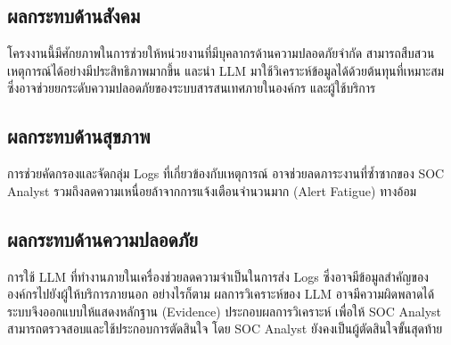 



\subsection{ผลกระทบด้านสังคม}
โครงงานนี้มีศักยภาพในการช่วยให้หน่วยงานที่มีบุคลากรด้านความปลอดภัยจำกัด
สามารถสืบสวนเหตุการณ์ได้อย่างมีประสิทธิภาพมากขึ้น
และนำ LLM มาใช้วิเคราะห์ข้อมูลได้ด้วยต้นทุนที่เหมาะสม
ซึ่งอาจช่วยยกระดับความปลอดภัยของระบบสารสนเทศภายในองค์กร
และผู้ใช้บริการ

\subsection{ผลกระทบด้านสุขภาพ}
การช่วยคัดกรองและจัดกลุ่ม Logs ที่เกี่ยวข้องกับเหตุการณ์
อาจช่วยลดภาระงานที่ซ้ำซากของ SOC Analyst
รวมถึงลดความเหนื่อยล้าจากการแจ้งเตือนจำนวนมาก
(Alert Fatigue) ทางอ้อม

\subsection{ผลกระทบด้านความปลอดภัย}
การใช้ LLM ที่ทำงานภายในเครื่องช่วยลดความจำเป็นในการส่ง
Logs ซึ่งอาจมีข้อมูลสำคัญขององค์กรไปยังผู้ให้บริการภายนอก
อย่างไรก็ตาม ผลการวิเคราะห์ของ LLM อาจมีความผิดพลาดได้
ระบบจึงออกแบบให้แสดงหลักฐาน (Evidence) ประกอบผลการวิเคราะห์
เพื่อให้ SOC Analyst สามารถตรวจสอบและใช้ประกอบการตัดสินใจ
โดย SOC Analyst ยังคงเป็นผู้ตัดสินใจขั้นสุดท้าย

